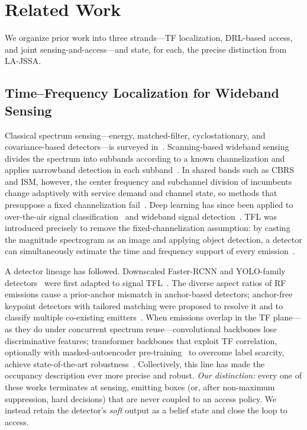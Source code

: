 \documentclass[journal]{IEEEtran}
\begin{document}
\section{Related Work}
\label{sec:related_work}

We organize prior work into three strands---TF localization, DRL-based
access, and joint sensing-and-access---and state, for each, the precise
distinction from LA-JSSA.

\subsection{Time--Frequency Localization for Wideband Sensing}
Classical spectrum sensing---energy, matched-filter, cyclostationary, and
covariance-based detectors---is surveyed
in~\cite{yucek2009survey,axell2012spectrum,arjoune2019comprehensive}.
Scanning-based wideband sensing divides the spectrum into subbands according
to a known channelization and applies narrowband detection in each
subband~\cite{wang2018}. In shared bands such as CBRS and ISM, however, the
center frequency and subchannel division of incumbents change adaptively with
service demand and channel state, so methods that presuppose a fixed
channelization fail~\cite{sohul2015cbrs}. Deep learning has since been applied
to over-the-air signal classification~\cite{oshea2018over,oshea2021dataset}
and wideband signal detection~\cite{vo2020wideband}. TFL was introduced
precisely to remove the fixed-channelization assumption: by casting the
magnitude spectrogram as an image and applying object detection, a detector
can simultaneously estimate the time and frequency support of every
emission~\cite{prasad2020,prasad2021spectrum}.

A detector lineage has followed. Downscaled Faster-RCNN and YOLO-family
detectors~\cite{redmon2018yolov3} were first adapted to signal TFL~\cite{prasad2020,li2022hf}. The
diverse aspect ratios of RF emissions cause a prior-anchor mismatch in
anchor-based detectors; anchor-free keypoint detectors with tailored matching
were proposed to resolve it and to classify multiple co-existing
emitters~\cite{zhao2024uav}. When emissions overlap in the TF plane---as they
do under concurrent spectrum reuse---convolutional backbones lose
discriminative features; transformer backbones that exploit TF correlation,
optionally with masked-autoencoder pre-training~\cite{he2022mae} to overcome label scarcity,
achieve state-of-the-art robustness~\cite{zhao2025trtfl_ssl,
zhang2024spectrumtransformer,he2022mae}. Collectively, this line has made the
occupancy description ever more precise and robust. \emph{Our distinction:}
every one of these works terminates at sensing, emitting boxes (or, after
non-maximum suppression, hard decisions) that are never coupled to an access
policy. We instead retain the detector's \emph{soft} output as a belief state
and close the loop to access.
\end{document}
